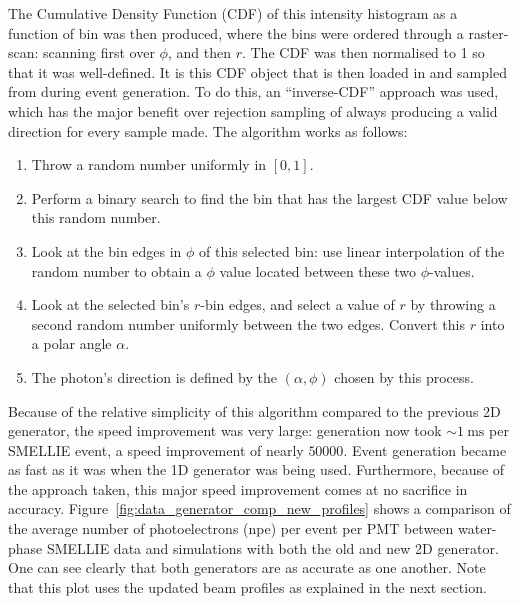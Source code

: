The Cumulative Density Function (CDF) of this intensity histogram as a function of bin was then produced, where the bins were ordered through a raster-scan: scanning first over $\phi$, and then $r$. The CDF was then normalised to 1 so that it was well-defined. It is this CDF object that is then loaded in and sampled from during event generation. To do this, an ``inverse-CDF'' approach was used, which has the major benefit over rejection sampling of always producing a valid direction for every sample made. The algorithm works as follows:

\begin{enumerate}
    \item Throw a random number uniformly in $[0,1]$.
    \item Perform a binary search to find the bin that has the largest CDF value below this random number.
    \item Look at the bin edges in $\phi$ of this selected bin: use linear interpolation of the random number to obtain a $\phi$ value located between these two $\phi$-values.
    \item Look at the selected bin's $r$-bin edges, and select a value of $r$ by throwing a second random number uniformly between the two edges. Convert this $r$ into a polar angle $\alpha$.
    \item The photon's direction is defined by the $(\alpha, \phi)$ chosen by this process. 
\end{enumerate}

Because of the relative simplicity of this algorithm compared to the previous 2D generator, the speed improvement was very large: generation now took $\sim\SI{1}{\milli\second}$ per SMELLIE event, a speed improvement of nearly $\num{50000}$. Event generation became as fast as it was when the 1D generator was being used. Furthermore, because of the approach taken, this major speed improvement comes at no sacrifice in accuracy. Figure~\ref{fig:data_generator_comp_new_profiles} shows a comparison of the average number of photoelectrons (npe) per event per PMT between water-phase SMELLIE data and simulations with both the old and new 2D generator. One can see clearly that both generators are as accurate as one another. Note that this plot uses the updated beam profiles as explained in the next section.

